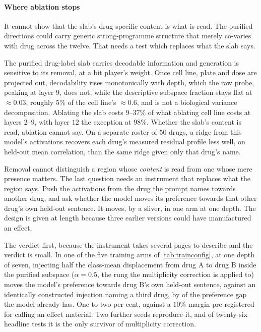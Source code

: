 \paragraph{Where ablation stops} It cannot show that the slab's drug-specific
content is what is read. The purified directions could carry generic
strong-programme structure that merely co-varies with drug across the twelve.
That needs a test which replaces what the slab says.

\begin{claim}
The purified drug-label slab carries decodable information and generation is
sensitive to its removal, at a bit player's weight. Once cell line, plate and
dose are projected out, decodability rises monotonically with depth, which the
raw probe, peaking at layer 9, does not, while the descriptive subspace fraction
stays flat at $\approx 0.03$, roughly $5\%$ of the cell line's $\approx 0.6$, and
is not a biological variance decomposition. Ablating the slab costs $9$--$37\%$
of what ablating cell line costs at layers $2$--$9$, with layer $12$ the
exception at $98\%$. Whether the slab's content is read, ablation cannot say.
On a separate roster of \num{50} drugs, a ridge from this model's activations
recovers each drug's measured residual profile less well, on held-out mean
correlation, than the same ridge given only that drug's name.
\end{claim}


\begin{question}[3]
Removal cannot distinguish a region whose \emph{content} is read from one whose
mere presence matters. The last question needs an instrument that replaces what
the region says. Push the activations from the drug the prompt names towards
another drug, and ask whether the model moves its preference towards that other
drug's own held-out sentence. It moves, by a sliver, in one arm at one depth. The
design is given at length because three earlier versions could have manufactured
an effect.
\end{question}

\noindent
The verdict first, because the instrument takes several pages to describe and the
verdict is small. In one of the five training arms of \cref{tab:trainconfig}, at
one depth of seven, injecting half the class-mean displacement from drug A to
drug B inside
the purified subspace ($\alpha = 0.5$, the rung the multiplicity correction is
applied to) moves the model's preference towards drug B's own held-out sentence,
against an identically constructed injection naming a third drug, by
 of the preference gap the model already has. One
to two per cent, against a $10\%$ margin pre-registered for calling an effect
material. Two further seeds reproduce it, and of twenty-six headline tests it is
the only survivor of multiplicity correction.

